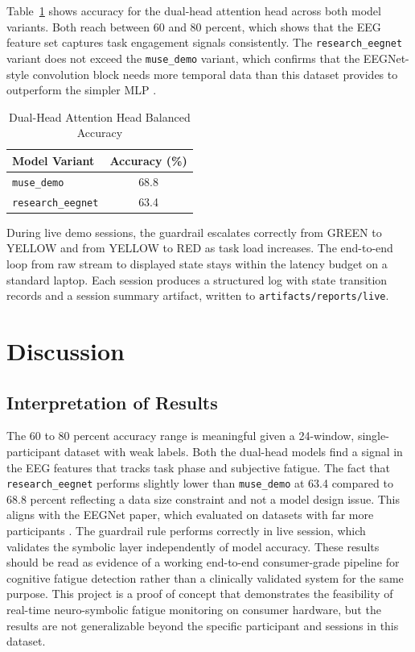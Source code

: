 \documentclass[conference]{IEEEtran}
\begin{document}
Table~\ref{tab:dual_head_validation} shows accuracy for the dual-head attention head across both model variants. Both reach between 60 and 80 percent, which shows that the EEG feature set captures task engagement signals consistently. The \texttt{research\_eegnet} variant does not exceed the \texttt{muse\_demo} variant, which confirms that the EEGNet-style convolution block needs more temporal data than this dataset provides to outperform the simpler MLP \cite{b2}.

\begin{table}[htbp]
\caption{Dual-Head Attention Head Balanced Accuracy}
\centering
\begin{tabular}{lc}
\toprule
\textbf{Model Variant} & \textbf{Accuracy (\%)} \\
\midrule
\texttt{muse\_demo}       & 68.8 \\
\texttt{research\_eegnet} & 63.4 \\
\bottomrule
\end{tabular}
\label{tab:dual_head_validation}
\end{table}

During live demo sessions, the guardrail escalates correctly from GREEN to YELLOW and from YELLOW to RED as task load increases. The end-to-end loop from raw stream to displayed state stays within the latency budget on a standard laptop. Each session produces a structured log with state transition records and a session summary artifact, written to \texttt{artifacts/reports/live}.

\section{Discussion}

\subsection{Interpretation of Results}

The 60 to 80 percent accuracy range is meaningful given a 24-window, single-participant dataset with weak labels. Both the dual-head models find a signal in the EEG features that tracks task phase and subjective fatigue. The fact that \texttt{research\_eegnet} performs slightly lower than \texttt{muse\_demo} at 63.4 compared to 68.8 percent reflecting a data size constraint and not a model design issue. This aligns with the EEGNet paper, which evaluated on datasets with far more participants \cite{b2}. The guardrail rule performs correctly in live session, which validates the symbolic layer independently of model accuracy. These results should be read as evidence of a working end-to-end consumer-grade pipeline for cognitive fatigue detection rather than a clinically validated system for the same purpose. This project is a proof of concept that demonstrates the feasibility of real-time neuro-symbolic fatigue monitoring on consumer hardware, but the results are not generalizable beyond the specific participant and sessions in this dataset.
\end{document}
